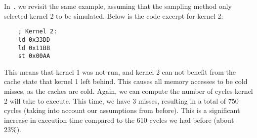 In~, we revisit the same example, assuming that the sampling method only selected kernel 2 to be simulated.
Below is the code excerpt for kernel 2:
\begin{verbatim}
    ; Kernel 2:
    ld 0x33DD
    ld 0x11BB
    st 0x00AA
\end{verbatim}

This means that kernel 1 was not run, and kernel 2 can not benefit from the cache state that kernel 1 left behind.
This causes all memory accesses to be cold misses, as the caches are cold.
Again, we can compute the number of cycles kernel 2 will take to execute.
This time, we have 3 misses, resulting in a total of 750 cycles (taking into account our assumptions from before).
This is a significant increase in execution time compared to the 610 cycles we had before (about 23\%).